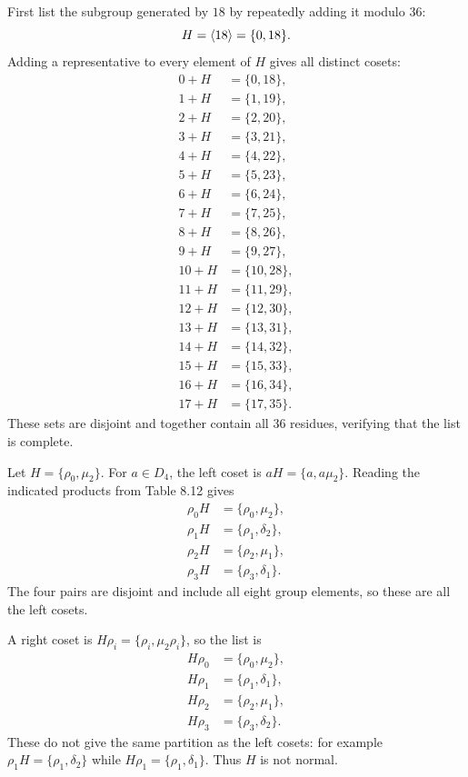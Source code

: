 First list the subgroup generated by $18$ by repeatedly adding it modulo $36$:\[H=\langle 18\rangle=\{0,18\}.\]Adding a representative to every element of $H$ gives all distinct cosets:\[\begin{aligned}0+H&=\{0,18\},\\
1+H&=\{1,19\},\\
2+H&=\{2,20\},\\
3+H&=\{3,21\},\\
4+H&=\{4,22\},\\
5+H&=\{5,23\},\\
6+H&=\{6,24\},\\
7+H&=\{7,25\},\\
8+H&=\{8,26\},\\
9+H&=\{9,27\},\\
10+H&=\{10,28\},\\
11+H&=\{11,29\},\\
12+H&=\{12,30\},\\
13+H&=\{13,31\},\\
14+H&=\{14,32\},\\
15+H&=\{15,33\},\\
16+H&=\{16,34\},\\
17+H&=\{17,35\}.\end{aligned}\]These sets are disjoint and together contain all $36$ residues, verifying that the list is complete.

Let $H=\{\rho_0,\mu_2\}$. For $a\in D_4$, the left coset is $aH=\{a,a\mu_2\}$. Reading the indicated products from Table 8.12 gives
\[\begin{aligned}\rho_0H&=\{\rho_0,\mu_2\},\\
\rho_1H&=\{\rho_1,\delta_2\},\\
\rho_2H&=\{\rho_2,\mu_1\},\\
\rho_3H&=\{\rho_3,\delta_1\}.\end{aligned}\]
The four pairs are disjoint and include all eight group elements, so these are all the left cosets.

A right coset is $H\rho_i=\{\rho_i,\mu_2\rho_i\}$, so the list is
\[\begin{aligned}H\rho_0&=\{\rho_0,\mu_2\},\\
H\rho_1&=\{\rho_1,\delta_1\},\\
H\rho_2&=\{\rho_2,\mu_1\},\\
H\rho_3&=\{\rho_3,\delta_2\}.\end{aligned}\]
These do not give the same partition as the left cosets: for example $\rho_1H=\{\rho_1,\delta_2\}$ while $H\rho_1=\{\rho_1,\delta_1\}$. Thus $H$ is not normal.

